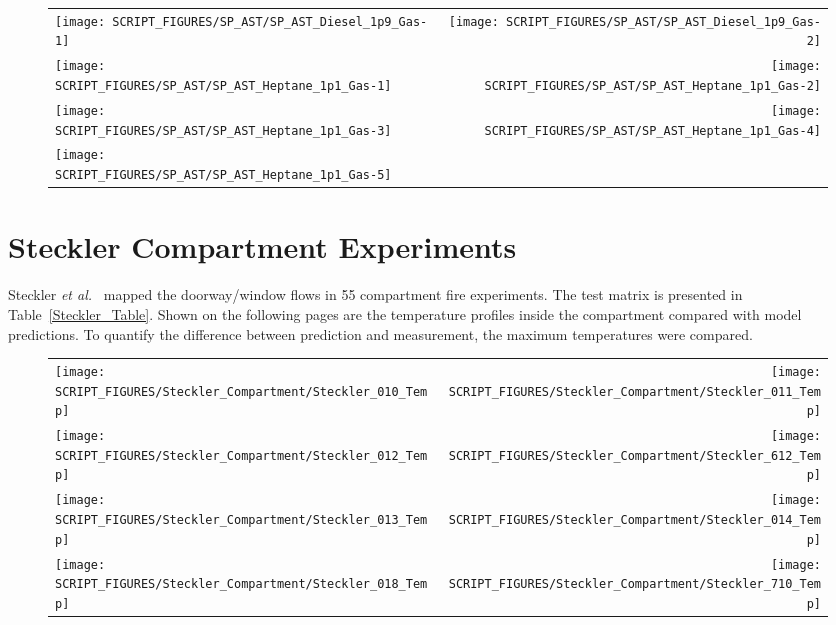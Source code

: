 \newpage

\begin{figure}[p]
\begin{tabular*}{\textwidth}{l@{\extracolsep{\fill}}r}
\texttt{[image: SCRIPT\_FIGURES/SP\_AST/SP\_AST\_Diesel\_1p9\_Gas-1]}   &  \texttt{[image: SCRIPT\_FIGURES/SP\_AST/SP\_AST\_Diesel\_1p9\_Gas-2]}    \\
\texttt{[image: SCRIPT\_FIGURES/SP\_AST/SP\_AST\_Heptane\_1p1\_Gas-1]}  &  \texttt{[image: SCRIPT\_FIGURES/SP\_AST/SP\_AST\_Heptane\_1p1\_Gas-2]}    \\
\texttt{[image: SCRIPT\_FIGURES/SP\_AST/SP\_AST\_Heptane\_1p1\_Gas-3]}  &  \texttt{[image: SCRIPT\_FIGURES/SP\_AST/SP\_AST\_Heptane\_1p1\_Gas-4]}     \\
\texttt{[image: SCRIPT\_FIGURES/SP\_AST/SP\_AST\_Heptane\_1p1\_Gas-5]}  &
\end{tabular*}
\label{SP_Diesel_1p9_Gas}
\end{figure}

\clearpage

\section{Steckler Compartment Experiments}

Steckler {\em et al.}~\cite{Steckler:1982} mapped the doorway/window flows in 55 compartment fire experiments. The test matrix is presented in Table~\ref{Steckler_Table}. Shown on the following pages are the temperature profiles inside the compartment compared with model predictions. To quantify the difference between prediction and measurement, the maximum temperatures were compared.



\begin{figure}[p]
\begin{tabular*}{\textwidth}{l@{\extracolsep{\fill}}r}
\texttt{[image: SCRIPT\_FIGURES/Steckler\_Compartment/Steckler\_010\_Temp]} &
\texttt{[image: SCRIPT\_FIGURES/Steckler\_Compartment/Steckler\_011\_Temp]} \\
\texttt{[image: SCRIPT\_FIGURES/Steckler\_Compartment/Steckler\_012\_Temp]} &
\texttt{[image: SCRIPT\_FIGURES/Steckler\_Compartment/Steckler\_612\_Temp]} \\
\texttt{[image: SCRIPT\_FIGURES/Steckler\_Compartment/Steckler\_013\_Temp]} &
\texttt{[image: SCRIPT\_FIGURES/Steckler\_Compartment/Steckler\_014\_Temp]} \\
\texttt{[image: SCRIPT\_FIGURES/Steckler\_Compartment/Steckler\_018\_Temp]} &
\texttt{[image: SCRIPT\_FIGURES/Steckler\_Compartment/Steckler\_710\_Temp]}
\end{tabular*}
\label{Steckler_Temp_1}
\end{figure}

